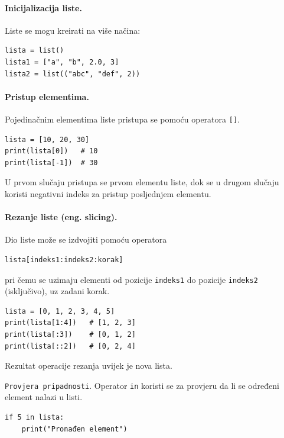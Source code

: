 \paragraph{Inicijalizacija liste.}  Liste se mogu kreirati na više načina: 

\begin{verbatim}
lista = list()
lista1 = ["a", "b", 2.0, 3] 
lista2 = list(("abc", "def", 2))
\end{verbatim}

\paragraph{Pristup elementima.}  Pojedinačnim elementima liste pristupa se pomoću operatora \texttt{[]}.

\begin{verbatim}
lista = [10, 20, 30]
print(lista[0])   # 10
print(lista[-1])  # 30
\end{verbatim}

U prvom slučaju pristupa se prvom elementu liste, dok se u drugom slučaju koristi negativni indeks za pristup posljednjem elementu.

\paragraph{Rezanje liste (eng. slicing).}

Dio liste može se izdvojiti pomoću operatora

\begin{verbatim}
lista[indeks1:indeks2:korak]
\end{verbatim}

pri čemu se uzimaju elementi od pozicije \texttt{indeks1} do pozicije \texttt{indeks2} (isključivo), uz zadani korak.

\begin{verbatim}
lista = [0, 1, 2, 3, 4, 5]
print(lista[1:4])   # [1, 2, 3]
print(lista[:3])    # [0, 1, 2]
print(lista[::2])   # [0, 2, 4]
\end{verbatim}

Rezultat operacije rezanja uvijek je nova lista.

\texttt{Provjera pripadnosti}.  Operator \texttt{in} koristi se za provjeru da li se određeni element nalazi u listi.

\begin{verbatim}
if 5 in lista:
    print("Pronađen element")
\end{verbatim}

